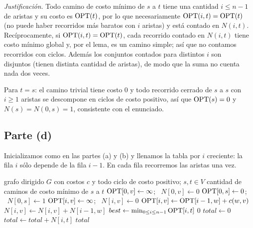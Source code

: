 \emph{Justificación.} Todo camino de costo mínimo de $s$ a $t$ tiene una cantidad $i\le n-1$ de aristas y su
costo es $\mathrm{OPT}(t)$, por lo que necesariamente $\mathrm{OPT}(i,t)=\mathrm{OPT}(t)$ (no puede haber recorridos más baratos con
$i$ aristas) y está contado en $N(i,t)$. Recíprocamente, si $\mathrm{OPT}(i,t)=\mathrm{OPT}(t)$, cada recorrido contado en
$N(i,t)$ tiene costo mínimo global y, por el lema, es un camino simple; así que no contamos recorridos con
ciclos. Además los conjuntos contados para distintos $i$ son disjuntos (tienen distinta cantidad de aristas),
de modo que la suma no cuenta nada dos veces.

Para $t=s$: el camino trivial tiene costo $0$ y todo recorrido cerrado de $s$ a $s$ con $i\ge1$ aristas se
descompone en ciclos de costo positivo, así que $\mathrm{OPT}(s)=0$ y $N(s)=N(0,s)=1$, consistente con el enunciado.

\subsection*{Parte (d)}

Inicializamos como en las partes (a) y (b) y llenamos la tabla por $i$ creciente: la fila $i$ sólo depende
de la fila $i-1$. En cada fila recorremos las aristas una vez.

\begin{algorithm}[H]
\caption{CantCaminosMinimos$(G=(V,E),c,s,t)$}
\begin{algorithmic}[1]
\Require grafo dirigido $G$ con costos $c$ y todo ciclo de costo positivo; $s,t\in V$
\Ensure cantidad de caminos de costo mínimo de $s$ a $t$
  \State $\mathrm{OPT}[0,v]\gets\infty$; \ $N[0,v]\gets 0$
\EndFor
\State $\mathrm{OPT}[0,s]\gets 0$; \ $N[0,s]\gets 1$
    \State $\mathrm{OPT}[i,v]\gets\infty$; \ $N[i,v]\gets 0$
  \EndFor
   
      \State $\mathrm{OPT}[i,v]\gets\mathrm{OPT}[i-1,w]+c(w,v)$
    \EndIf
  \EndFor
   
      \State $N[i,v]\gets N[i,v]+N[i-1,w]$
    \EndIf
  \EndFor
\EndFor
\State $best\gets\min_{0\le i\le n-1}\mathrm{OPT}[i,t]$ 
 \Return $0$ \EndIf
\State $total\gets 0$
   $total\gets total+N[i,t]$ \EndIf
\EndFor
\State \Return $total$
\end{algorithmic}
\end{algorithm}

